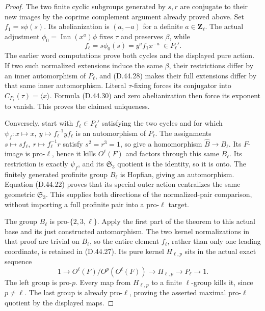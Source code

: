 \begin{proof}
The two finite cyclic subgroups generated by \(s,r\)
are conjugate to their new images by the coprime
complement argument already proved above.
Set \(f_1=s\phi(s)\). Its abelianization is
\((a,-a)\) for a definite \(a\in\mathbf Z_\ell\).
The actual adjustment
\(\phi_0=\operatorname{Inn}(x^a)\phi\) fixes \(\tau\)
and preserves \(\beta\), while
\[
                 f_\ell=s\phi_0(s)=y^a f_1x^{-a}
                      \ \in P_\ell'.
 \tag{D.44.30}
\]
The earlier word computations prove both cycles and the
displayed pure action.
If two such normalized extensions induce the same
\(\beta\), their restrictions differ by an inner
automorphism of \(P_\ell\), and
\textup{(D.44.28)} makes their full extensions differ by
that same inner automorphism.
Literal \(\tau\)-fixing forces its conjugator into
\(C_{P_\ell}(\tau)=\langle x\rangle\).
Formula \textup{(D.44.30)} and zero abelianization then
force its exponent to vanish. This proves the claimed
uniqueness.

Conversely, start with \(f_\ell\in P_\ell'\) satisfying
the two cycles and for which
\(\psi_f:x\mapsto x,\ y\mapsto f_\ell^{-1}yf_\ell\)
is an automorphism of \(P_\ell\).
The assignments \(s\mapsto sf_\ell,\ r\mapsto
f_\ell^{-1}r\) satisfy \(s^2=r^3=1\), so give a
homomorphism \(\widehat B\to B_\ell\).
Its \(F\)-image is pro-\(\ell\), hence it kills
\(O^\ell(F)\) and factors through this same \(B_\ell\).
Its restriction is exactly \(\psi_f\), and its
\(\mathfrak S_3\) quotient is the identity, so it is
onto. The finitely generated profinite group \(B_\ell\)
is Hopfian, giving an automorphism.
Equation \textup{(D.44.22)} proves that its special
outer action centralizes the same geometric
\(\mathfrak S_3\). This supplies both directions of
the normalized-pair comparison, without importing a
full profinite pair into a pro-\(\ell\) target.

The group \(B_\ell\) is pro-\(\{2,3,\ell\}\).
Apply the first part of the theorem to this actual base
and its just constructed automorphism. The two kernel
normalizations in that proof are trivial on \(B_\ell\),
so the entire element \(f_\ell\), rather than only one
leading coordinate, is retained in
\textup{(D.44.27)}.
Its pure kernel \(H_{\ell,p}\) sits in the actual exact
sequence
\[
 1\longrightarrow
       O^\ell(F)/O^p(O^\ell(F))
   \longrightarrow H_{\ell,p}
   \longrightarrow P_\ell\longrightarrow1 .
 \tag{D.44.31}
\]
The left group is pro-\(p\).
Every map from \(H_{\ell,p}\) to a finite \(\ell\)-group
kills it, since \(p\ne\ell\).
The last group is already pro-\(\ell\), proving the
asserted maximal pro-\(\ell\) quotient by the displayed
maps.


\end{proof}
